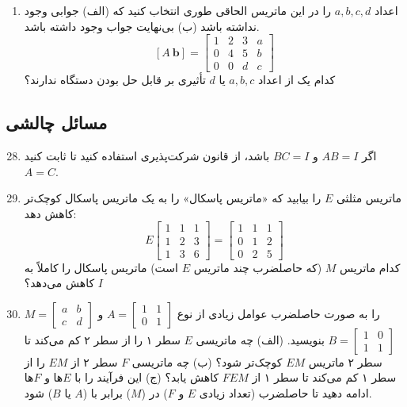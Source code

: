 \documentclass[12pt, a4paper]{book}
\begin{document}
\begin{enumerate}
		\item اعداد $a, b, c, d$ را در این ماتریس الحاقی طوری انتخاب کنید که (الف) جوابی وجود نداشته باشد (ب) بی‌نهایت جواب وجود داشته باشد.
		\[ [A \ \mathbf{b}] = \left[ \begin{array}{ccc|c} 1 & 2 & 3 & a \\ 0 & 4 & 5 & b \\ 0 & 0 & d & c \end{array} \right] \]
		کدام یک از اعداد $a, b, c$ یا $d$ تأثیری بر قابل حل بودن دستگاه ندارند؟
	\end{enumerate}
	
	\subsection*{مسائل چالشی}
	\begin{enumerate}
		\setcounter{enumi}{27}
		\item اگر $AB=I$ و $BC=I$ باشد، از قانون شرکت‌پذیری استفاده کنید تا ثابت کنید $A=C$.
		\item ماتریس مثلثی $E$ را بیابید که «ماتریس پاسکال» را به یک ماتریس پاسکال کوچک‌تر کاهش دهد:
		\[ E \begin{bmatrix} 1 & 1 & 1 \\ 1 & 2 & 3 \\ 1 & 3 & 6 \end{bmatrix} = \begin{bmatrix} 1 & 1 & 1 \\ 0 & 1 & 2 \\ 0 & 2 & 5 \end{bmatrix} \]
		کدام ماتریس $M$ (که حاصلضرب چند ماتریس $E$ است) ماتریس پاسکال را کاملاً به $I$ کاهش می‌دهد؟
		\item $M = \begin{bmatrix} a & b \\ c & d \end{bmatrix}$ را به صورت حاصلضرب عوامل زیادی از نوع $A = \begin{bmatrix} 1 & 1 \\ 0 & 1 \end{bmatrix}$ و $B = \begin{bmatrix} 1 & 0 \\ 1 & 1 \end{bmatrix}$ بنویسید.
		(الف) چه ماتریسی $E$ سطر ۱ را از سطر ۲ کم می‌کند تا سطر ۲ ماتریس $EM$ کوچک‌تر شود؟
		(ب) چه ماتریسی $F$ سطر ۲ از $EM$ را از سطر ۱ کم می‌کند تا سطر ۱ از $FEM$ کاهش یابد؟
		(ج) این فرآیند را با $E$ها و $F$ها ادامه دهید تا حاصلضرب (تعداد زیادی $E$ و $F$) در ($M$) برابر با ($A$ یا $B$) شود.

\end{enumerate}
\end{document}
